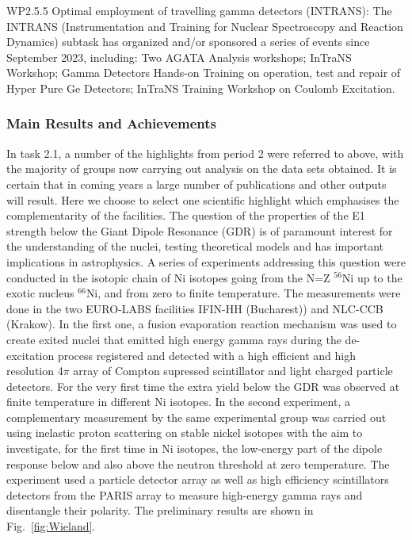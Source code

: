 WP2.5.5 Optimal employment of travelling gamma detectors (INTRANS): The INTRANS (Instrumentation and Training for Nuclear Spectroscopy and Reaction Dynamics) subtask has organized and/or sponsored a series of events since September 2023, including: Two AGATA Analysis workshops; InTraNS Workshop; Gamma Detectors Hands-on Training on operation, test and repair of Hyper Pure Ge Detectors; InTraNS Training Workshop on Coulomb Excitation.



\subsubsection*{Main Results and Achievements}


In task 2.1, a number of the highlights from period 2 were referred to above, with the majority of groups now carrying out analysis on the data sets obtained. It is certain that in coming years a large number of publications and other outputs will result. Here we choose to select one scientific highlight which emphasises the complementarity of the facilities. 
The question of the properties of the E1 strength below the Giant Dipole Resonance (GDR) is of paramount interest for the understanding of the nuclei, testing theoretical models and has important implications in astrophysics. A series of experiments addressing this question were conducted in the isotopic chain of Ni isotopes going from the N=Z $^{56}$Ni up to the exotic nucleus $^{66}$Ni, and from zero to finite temperature. The measurements were done in the two EURO-LABS facilities IFIN-HH (Bucharest)) and NLC-CCB (Krakow). In the first one, a fusion evaporation reaction mechanism was used to create exited nuclei that emitted high energy gamma rays during the de-excitation process registered and detected with a high efficient and high resolution 4$\pi$ array of Compton supressed scintillator and light charged particle detectors.  For the very first time the extra yield below the GDR was observed at finite temperature in different Ni isotopes. In the second experiment, a complementary measurement by the same experimental group was carried out using inelastic proton scattering on stable nickel isotopes with the aim to investigate, for the first time in Ni isotopes, the low-energy part of the dipole response below and also above the neutron threshold at zero temperature. The experiment used a particle detector array as well as high efficiency scintillators detectors from the PARIS array to measure high-energy gamma rays and disentangle their polarity. The preliminary results are shown in Fig.~\ref{fig:Wieland}.

